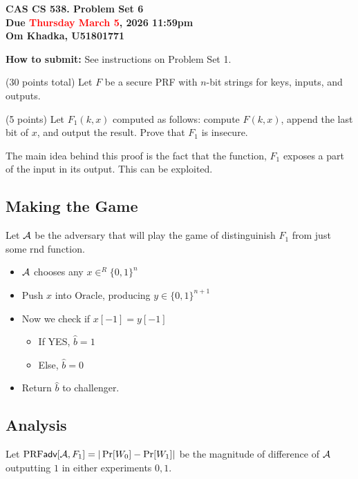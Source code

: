 \documentclass[12pt]{article}
\newif\ifsol
\begin{document}
\begin{center}
\Large{\textbf{CAS CS 538.  \ifsol Solutions to \fi Problem Set 6}}\\
\smallskip
\large{\textbf{Due \textcolor{red}{Thursday March 5}, 2026 11:59pm
}}\\
\large{\textbf{Om Khadka, U51801771}}
\end{center}

\noindent
\textbf{How to submit:}  See instructions on Problem Set 1. 


\begin{problem} (30 points total)
Let $F$ be a secure PRF with $n$-bit strings for keys, inputs, and outputs.

\begin{ppart} (5 points)
Let $F_1(k,x)$ computed as follows: compute $F(k, x)$, append the last bit of $x$, and output the result. Prove that $F_1$ is insecure.
\end{ppart}

\begin{solution}
The main idea behind this proof is the fact that the function, $F_1$ exposes a part of the input in its output. This can be exploited.

\subsection*{Making the Game}
Let $\mathcal{A}$ be the adversary that will play the game of distinguinish $F_1$ from just some rnd function.
\begin{itemize}
  \item $\mathcal{A}$ chooses any $x \in^R \{0, 1\}^n$
  \item Push $x$ into $\text{Oracle}$, producing $y \in \{0, 1\}^{n+1}$
  \item Now we check if $x[-1] = y[-1]$
  \begin{itemize}
    \item If YES, $\hat{b} = 1$
    \item Else, $\hat{b} = 0$
  \end{itemize}
  \item Return $\hat{b}$ to challenger.
\end{itemize}

\subsection*{Analysis}
Let $\textrm{PRF}\textsf{adv}[\mathcal{A}, F_1] = |\Pr[W_0] - \Pr[W_1]|$ be the magnitude of difference of $\mathcal{A}$ outputting $1$ in either experiments $0, 1$.


\end{solution}
\end{problem}
\end{document}
